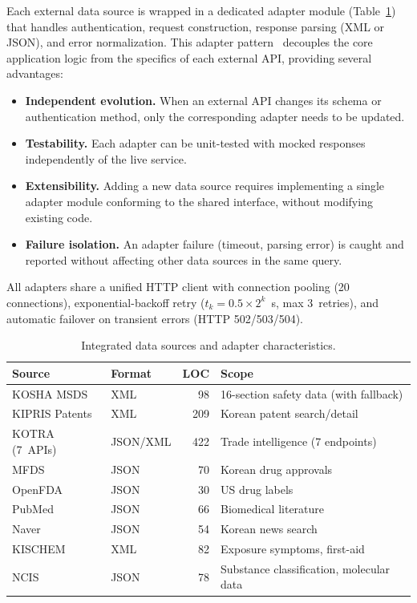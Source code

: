 \documentclass[10pt]{article}
\begin{document}
Each external data source is wrapped in a dedicated adapter module (Table~\ref{tab:sources}) that handles authentication, request construction, response parsing (XML or JSON), and error normalization.
This adapter pattern~\cite{gamma_design_patterns} decouples the core application logic from the specifics of each external API, providing several advantages:

\begin{itemize}[nosep]
  \item \textbf{Independent evolution.} When an external API changes its schema or authentication method, only the corresponding adapter needs to be updated.
  \item \textbf{Testability.} Each adapter can be unit-tested with mocked responses independently of the live service.
  \item \textbf{Extensibility.} Adding a new data source requires implementing a single adapter module conforming to the shared interface, without modifying existing code.
  \item \textbf{Failure isolation.} An adapter failure (timeout, parsing error) is caught and reported without affecting other data sources in the same query.
\end{itemize}

All adapters share a unified HTTP client with connection pooling (20 connections), exponential-backoff retry ($t_k = 0.5 \times 2^k$~s, max 3~retries), and automatic failover on transient errors (HTTP 502/503/504).

\begin{table}[H]
\centering
\caption{Integrated data sources and adapter characteristics.}
\label{tab:sources}
\small
\begin{tabular}{@{}llrl@{}}
\toprule
\textbf{Source} & \textbf{Format} & \textbf{LOC} & \textbf{Scope} \\
\midrule
KOSHA MSDS & XML & 98 & 16-section safety data (with fallback) \\
KIPRIS Patents & XML & 209 & Korean patent search/detail \\
KOTRA (7~APIs) & JSON/XML & 422 & Trade intelligence (7 endpoints) \\
MFDS & JSON & 70 & Korean drug approvals \\
OpenFDA & JSON & 30 & US drug labels \\
PubMed & JSON & 66 & Biomedical literature \\
Naver & JSON & 54 & Korean news search \\
KISCHEM & XML & 82 & Exposure symptoms, first-aid \\
NCIS & JSON & 78 & Substance classification, molecular data \\
\bottomrule
\end{tabular}
\end{table}
\end{document}
